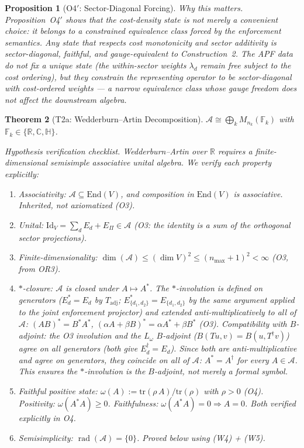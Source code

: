 \documentclass[11pt,a4paper]{article}
\newtheorem{theorem}{Theorem}[section]
\newtheorem{proposition}[theorem]{Proposition}
\theoremstyle{definition}
\newcommand{\End}{\mathrm{End}}
\newcommand{\tr}{\mathrm{tr}}
\DeclareMathOperator{\rad}{rad}
\begin{document}
\begin{proposition}[O4$'$: Sector-Diagonal Forcing]
\smallskip\noindent\textit{Why this matters.}  Proposition~O4$'$ shows that the cost-density state is not merely a convenient choice: it belongs to a \emph{constrained} equivalence class forced by the enforcement semantics.  Any state that respects cost monotonicity and sector additivity is sector-diagonal, faithful, and gauge-equivalent to Construction~2.  The APF data do not fix a unique state (the within-sector weights $\lambda_d$ remain free subject to the cost ordering), but they \emph{constrain} the representing operator to be sector-diagonal with cost-ordered weights --- a narrow equivalence class whose gauge freedom does not affect the downstream algebra.
\end{proposition}

\begin{theorem}[T2a: Wedderburn--Artin Decomposition]\label{thm:T2a}
$\mathcal{A} \cong \bigoplus_k M_{n_k}(\mathbb{F}_k)$ with $\mathbb{F}_k \in \{\mathbb{R}, \mathbb{C}, \mathbb{H}\}$.

\smallskip\noindent\textit{Hypothesis verification checklist.}  Wedderburn--Artin over $\mathbb{R}$ requires a finite-dimensional semisimple associative unital algebra.  We verify each property explicitly:

\begin{enumerate}[nosep,label=(W\arabic*),leftmargin=3em]
\item \textit{Associativity:} $\mathcal{A} \subseteq \End(V)$, and composition in $\End(V)$ is associative.  Inherited, not axiomatized (O3).
\item \textit{Unital:} $\mathrm{Id}_V = \sum_d E_d + E_\Pi \in \mathcal{A}$ (O3: the identity is a sum of the orthogonal sector projections).
\item \textit{Finite-dimensionality:} $\dim(\mathcal{A}) \le (\dim V)^2 \le (n_{\max}+1)^2 < \infty$ (O3, from OR3).
\item \textit{$*$-closure:} $\mathcal{A}$ is closed under $A \mapsto A^*$.  The $*$-involution is defined on generators ($E_d^* = E_d$ by $T_{\mathrm{adj}}$; $E_{\{d_1,d_2\}}^* = E_{\{d_1,d_2\}}$ by the same argument applied to the joint enforcement projector) and extended anti-multiplicatively to all of $\mathcal{A}$: $(AB)^* = B^*A^*$, $(\alpha A + \beta B)^* = \alpha A^* + \beta B^*$ (O3).  \textit{Compatibility with $B$-adjoint:} the O3 involution and the $L_\omega$ $B$-adjoint ($B(Tu,v) = B(u, T^\dagger v)$) agree on all generators (both give $E_d^\dagger = E_d$).  Since both are anti-multiplicative and agree on generators, they coincide on all of $\mathcal{A}$: $A^* = A^\dagger$ for every $A \in \mathcal{A}$.  This ensures the $*$-involution is the $B$-adjoint, not merely a formal symbol.
\item \textit{Faithful positive state:} $\omega(A) := \tr(\rho\,A)/\tr(\rho)$ with $\rho > 0$ (O4).  Positivity: $\omega(A^*A) \ge 0$.  Faithfulness: $\omega(A^*A) = 0 \Rightarrow A = 0$.  Both verified explicitly in O4.
\item \textit{Semisimplicity:} $\rad(\mathcal{A}) = \{0\}$.  Proved below using (W4) + (W5).
\end{enumerate}


\end{theorem}
\end{document}
